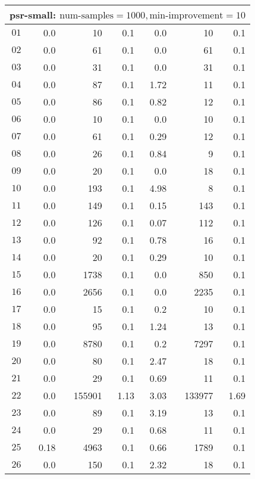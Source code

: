 \begin{longtable}{|c||r|r|r||r|r|r|}
\multicolumn{7}{|l|}{psr-small: $\text{num-samples}=1000,\text{min-improvement}=10$}\\\hline
$01$ & 0.0 & 10 & 0.1 &0.0 & 10 & 0.1 \\\hline
$02$ & 0.0 & 61 & 0.1 &0.0 & 61 & 0.1 \\\hline
$03$ & 0.0 & 31 & 0.1 &0.0 & 31 & 0.1 \\\hline
$04$ & 0.0 & 87 & 0.1 &1.72 & 11 & 0.1 \\\hline
$05$ & 0.0 & 86 & 0.1 &0.82 & 12 & 0.1 \\\hline
$06$ & 0.0 & 10 & 0.1 &0.0 & 10 & 0.1 \\\hline
$07$ & 0.0 & 61 & 0.1 &0.29 & 12 & 0.1 \\\hline
$08$ & 0.0 & 26 & 0.1 &0.84 & 9 & 0.1 \\\hline
$09$ & 0.0 & 20 & 0.1 &0.0 & 18 & 0.1 \\\hline
$10$ & 0.0 & 193 & 0.1 &4.98 & 8 & 0.1 \\\hline
$11$ & 0.0 & 149 & 0.1 &0.15 & 143 & 0.1 \\\hline
$12$ & 0.0 & 126 & 0.1 &0.07 & 112 & 0.1 \\\hline
$13$ & 0.0 & 92 & 0.1 &0.78 & 16 & 0.1 \\\hline
$14$ & 0.0 & 20 & 0.1 &0.29 & 10 & 0.1 \\\hline
$15$ & 0.0 & 1738 & 0.1 &0.0 & 850 & 0.1 \\\hline
$16$ & 0.0 & 2656 & 0.1 &0.0 & 2235 & 0.1 \\\hline
$17$ & 0.0 & 15 & 0.1 &0.2 & 10 & 0.1 \\\hline
$18$ & 0.0 & 95 & 0.1 &1.24 & 13 & 0.1 \\\hline
$19$ & 0.0 & 8780 & 0.1 &0.2 & 7297 & 0.1 \\\hline
$20$ & 0.0 & 80 & 0.1 &2.47 & 18 & 0.1 \\\hline
$21$ & 0.0 & 29 & 0.1 &0.69 & 11 & 0.1 \\\hline
$22$ & 0.0 & 155901 & 1.13 &3.03 & 133977 & 1.69 \\\hline
$23$ & 0.0 & 89 & 0.1 &3.19 & 13 & 0.1 \\\hline
$24$ & 0.0 & 29 & 0.1 &0.68 & 11 & 0.1 \\\hline
$25$ & 0.18 & 4963 & 0.1 &0.66 & 1789 & 0.1 \\\hline
$26$ & 0.0 & 150 & 0.1 &2.32 & 18 & 0.1 \\\hline

\end{longtable}
